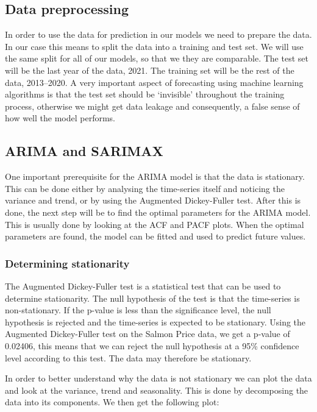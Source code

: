 \subsection{Data preprocessing}
In order to use the data for prediction in our models we need to prepare the data. In our case this means to split the data into a training and test set. We will use the same split for all of our models, so that we they are comparable. The test set will be the last year of the data, 2021. The training set will be the rest of the data, 2013--2020. A very important aspect of forecasting using machine learning algorithms is that the test set should be `invisible' throughout the training process, otherwise we might get data leakage and consequently, a false sense of how well the model performs.~\parencite{brownlee_2016}
\subsection{ARIMA and SARIMAX}\label{ARIMA and SARIMAX Methodology}

One important prerequisite for the ARIMA model is that the data is stationary. This can be done either by analysing the time-series itself and noticing the variance and trend, or by using the Augmented Dickey-Fuller test. 
After this is done, the next step will be to find the optimal parameters for the ARIMA model. This is usually done by looking at the ACF and PACF plots. 
When the optimal parameters are found, the model can be fitted and used to predict future values.~\parencite{hyndman_athanasopoulos_2021}

\subsubsection{Determining stationarity}\label{DeterminingStationarity}
The Augmented Dickey-Fuller test is a statistical test that can be used to determine stationarity. The null hypothesis of the test is that the time-series is non-stationary. If the p-value is less than the significance level, the null hypothesis is rejected and the time-series is expected to be stationary.
Using the Augmented Dickey-Fuller test on the Salmon Price data, we get a p-value of 0.02406, this means that we can reject the null hypothesis at a 95\% confidence level according to this test. The data may therefore be stationary.~\parencite{Dickey_Fuller1979}

In order to better understand why the data is not stationary we can plot the data and look at the variance, trend and seasonality. This is done by decomposing the data into its components. We then get the following plot: 

